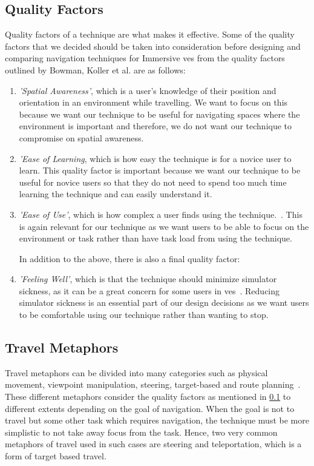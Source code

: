 \subsection{Quality Factors}
\label{subsection RW Navigation: Quality Factors}
Quality factors of a technique are what makes it effective. Some of the quality factors that we decided should be taken into consideration before designing and comparing navigation techniques for Immersive \acrshort{ve}s from the quality factors outlined by Bowman, Koller et al. are as follows:
\begin{enumerate}
	\item \textit{'Spatial Awareness'}, which is a user's knowledge of their position and orientation in an environment while travelling. We want to focus on this because we want our technique to be useful for navigating spaces where the environment is important and therefore, we do not want our technique to compromise on spatial awareness.
	\item \textit{'Ease of Learning}, which is how easy the technique is for a novice user to learn. This quality factor is important because we want our technique to be useful for novice users so that they do not need to spend too much time learning the technique and can easily understand it.
	\item \textit{'Ease of Use'}, which is how complex a user finds using the technique.~\cite{Bowman1997}. This is again relevant for our technique as we want users to be able to focus on the environment or task rather than have task load from using the technique. 
	
	In addition to the above, there is also a final quality factor:
	\item \textit{'Feeling Well'}, which is that the technique should minimize simulator sickness, as it can be a great concern for some users in \acrshort{ve}s~\cite{LaViola2000}. Reducing simulator sickness is an essential part of our design decisions as we want users to be comfortable using our technique rather than wanting to stop.
\end{enumerate}

\subsection{Travel Metaphors}
\label{subsection RW Navigation: Travel Metaphors}
Travel metaphors can be divided into many categories such as physical movement, viewpoint manipulation, steering, target-based and route planning~\cite{Bowman2001}. These different metaphors consider the quality factors as mentioned in \cref{subsection RW Navigation: Quality Factors} to different extents depending on the goal of navigation. When the goal is not to travel but some other task which requires navigation, the technique must be more simplistic to not take away focus from the task. Hence, two very common metaphors of travel used in such cases are steering and teleportation, which is a form of target based travel.

